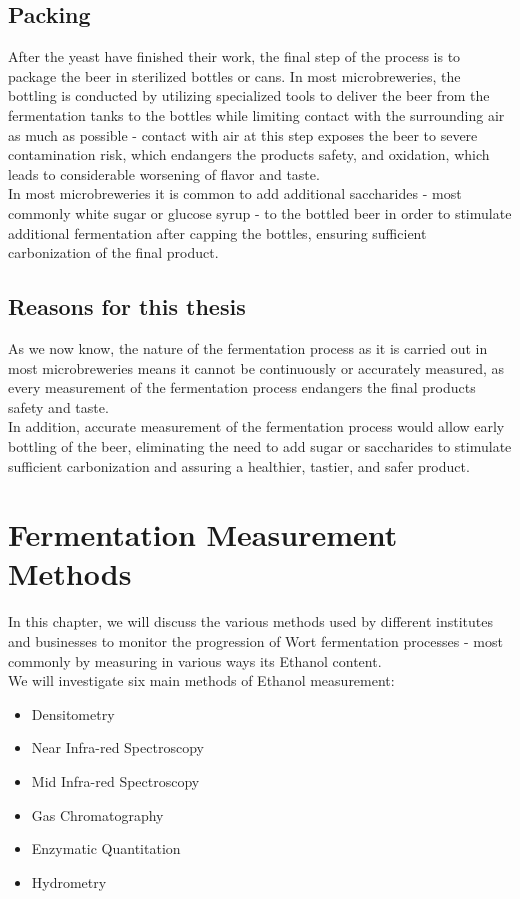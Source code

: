 \documentclass[twoside]{ctuthesis}
\theoremstyle{plain}
\theoremstyle{definition}
\theoremstyle{note}
\begin{document}
\section{Packing}
After the yeast have finished their work, the final step of the process is to package the beer in sterilized bottles or cans. In most microbreweries, the bottling is conducted by utilizing specialized tools to deliver the beer from the fermentation tanks to the bottles while limiting contact with the surrounding air as much as possible - contact with air at this step exposes the beer to severe contamination risk,  which endangers the products safety, and oxidation, which leads to considerable worsening of flavor and taste.\\
In most microbreweries it is common to add additional saccharides - most commonly white sugar or glucose syrup - to the bottled beer in order to stimulate additional fermentation after capping the bottles, ensuring sufficient carbonization of the final product.

\section{Reasons for this thesis}
As we now know, the nature of the fermentation process as it is carried out in most microbreweries means it cannot be continuously or accurately measured, as every measurement of the fermentation process endangers the final products safety and taste.\\
In addition, accurate measurement of the fermentation process would allow early bottling of the beer, eliminating the need to add sugar or saccharides to stimulate sufficient carbonization and assuring a healthier, tastier, and safer product.

\chapter{Fermentation Measurement Methods}
In this chapter, we will discuss the various methods used by different institutes and businesses to monitor the progression of Wort fermentation processes - most commonly by measuring in various ways its Ethanol content.\\
We will investigate six main methods of Ethanol measurement:\\

\begin{itemize}
	\item Densitometry 
	\item Near Infra-red Spectroscopy
	\item Mid Infra-red Spectroscopy
	\item Gas Chromatography
	\item Enzymatic Quantitation
	\item Hydrometry
\end{itemize}
\end{document}
